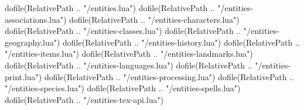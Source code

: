 
\begin{luacode*}
	dofile(RelativePath .. "/entities.lua")
	dofile(RelativePath .. "/entities-associations.lua")
	dofile(RelativePath .. "/entities-characters.lua")
	dofile(RelativePath .. "/entities-classes.lua")
	dofile(RelativePath .. "/entities-geography.lua")
	dofile(RelativePath .. "/entities-history.lua")
	dofile(RelativePath .. "/entities-items.lua")
	dofile(RelativePath .. "/entities-landmarks.lua")
	dofile(RelativePath .. "/entities-languages.lua")
	dofile(RelativePath .. "/entities-print.lua")
	dofile(RelativePath .. "/entities-processing.lua")
	dofile(RelativePath .. "/entities-species.lua")
	dofile(RelativePath .. "/entities-spells.lua")
	dofile(RelativePath .. "/entities-tex-api.lua")
\end{luacode*}

\newcommand{\setDefaultLocation}[1]{
	\directlua{DefaultLocation = "#1"}
}

\newcommand{\resetCurrentLabels}{
	\setDefaultLocation{}
	\directlua{
		LogError("Use of deprecated function resetCurrentLabels.")
	}
}

\newcommand{\newEntity}[4]{
	\directlua{
		NewEntity("#1","#2", [[\detokenize{#3}]], [[\detokenize{#4}]])
	}
}

\newcommand{\newPlace}[3]{
	\newEntity{#1}{place}{#2}{#3}
}

\newcommand{\declarePC}[1]{
	\directlua{DeclarePC("#1")}
}

\newcommand{\newNPC}[3]{
	\directlua{
		NewCharacter("#1", [[\detokenize{#2}]], [[\detokenize{#3}]])
	}
}

\newcommand{\newGod}[3]{
	\newEntity{#1}{god}{#2}{#3}
	\setSpecies{gott}
}

\newcommand{\charappearance}[3]{
	\addDescriptor[Körper:]{Erscheinung}{#1}
	\addDescriptor[Kleidung und Ausrüstung:]{Erscheinung}{#2}
	\addDescriptor[Stimme / Verhalten:]{Erscheinung}{#3}
}

\newcommand{\newOrganisation}[3]{
	\newEntity{#1}{organisation}{#2}{#3}
}

\newcommand{\newFamily}[3]{
	\newEntity{#1}{family}{#2}{#3}
}

\newcommand{\newShip}[3]{
	\newEntity{#1}{ship}{#2}{#3}
}

\newcommand{\newSpecies}[3]{
	\newEntity{#1}{species}{#2}{#3}
}

\newcommand{\newLanguage}[3]{
	\newEntity{#1}{language}{#2}{#3}
}

\newcommand{\newClass}[2]{
	\newEntity{#1}{class}{}{#2}
}

